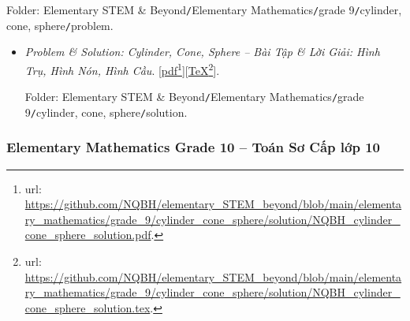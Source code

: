 \documentclass[12pt,twoside]{book}
\begin{document}
\begin{enumerate}
\begin{center}
	\end{center}
	Folder: {\sf Elementary STEM \& Beyond{\tt/}Elementary Mathematics{\tt/}grade 9{\tt/}cylinder, cone, sphere{\tt/}problem}.
	\begin{itemize}
		\item  {\it Problem \& Solution: Cylinder, Cone, Sphere -- Bài Tập \& Lời Giải: Hình Trụ, Hình Nón, Hình Cầu}. [\href{https://github.com/NQBH/elementary_STEM_beyond/blob/main/elementary_mathematics/grade_9/cylinder_cone_sphere/solution/NQBH_cylinder_cone_sphere_solution.pdf}{pdf}\footnote{{\sc url}: \url{https://github.com/NQBH/elementary_STEM_beyond/blob/main/elementary_mathematics/grade_9/cylinder_cone_sphere/solution/NQBH_cylinder_cone_sphere_solution.pdf}.}][\href{https://github.com/NQBH/elementary_STEM_beyond/blob/main/elementary_mathematics/grade_9/cylinder_cone_sphere/solution/NQBH_cylinder_cone_sphere_solution.tex}{\TeX}\footnote{{\sc url}: \url{https://github.com/NQBH/elementary_STEM_beyond/blob/main/elementary_mathematics/grade_9/cylinder_cone_sphere/solution/NQBH_cylinder_cone_sphere_solution.tex}.}].
		
		Folder: {\sf Elementary STEM \& Beyond{\tt/}Elementary Mathematics{\tt/}grade 9{\tt/}cylinder, cone, sphere{\tt/}solution}.
	\end{itemize}
\end{enumerate}

\subsubsection{Elementary Mathematics Grade 10 -- Toán Sơ Cấp lớp 10}
\label{sect: emath10}
\end{document}
